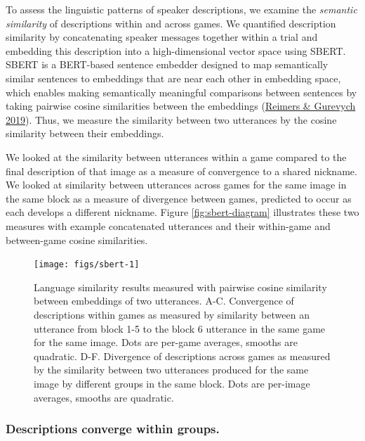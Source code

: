 \documentclass[
  english,
  a4paper,
]{article}
\begin{document}
To assess the linguistic patterns of speaker descriptions, we examine the \emph{semantic similarity} of descriptions within and across games. We quantified description similarity by concatenating speaker messages together within a trial and embedding this description into a high-dimensional vector space using SBERT. SBERT is a BERT-based sentence embedder designed to map semantically similar sentences to embeddings that are near each other in embedding space, which enables making semantically meaningful comparisons between sentences by taking pairwise cosine similarities between the embeddings (\protect\hyperlink{ref-reimers2019}{Reimers \& Gurevych 2019}). Thus, we measure the similarity between two utterances by the cosine similarity between their embeddings.

We looked at the similarity between utterances within a game compared to the final description of that image as a measure of convergence to a shared nickname. We looked at similarity between utterances across games for the same image in the same block as a measure of divergence between games, predicted to occur as each develops a different nickname. Figure \ref{fig:sbert-diagram} illustrates these two measures with example concatenated utterances and their within-game and between-game cosine similarities.

\begin{figure}[t!]

{\centering \texttt{[image: figs/sbert-1]} 

}

\caption{Language similarity results measured with pairwise cosine similarity between embeddings of two utterances. A-C. Convergence of descriptions within games as measured by similarity between an utterance from block 1-5 to the block 6 utterance in the same game for the same image. Dots are per-game averages, smooths are quadratic. D-F. Divergence of descriptions across games as measured by the similarity between two utterances produced for the same image by different groups in the same block. Dots are per-image averages, smooths are quadratic.}\label{fig:sbert}
\end{figure}

\hypertarget{descriptions-converge-within-groups.}{%
\subsubsection{Descriptions converge within groups.}\label{descriptions-converge-within-groups.}}
\end{document}
